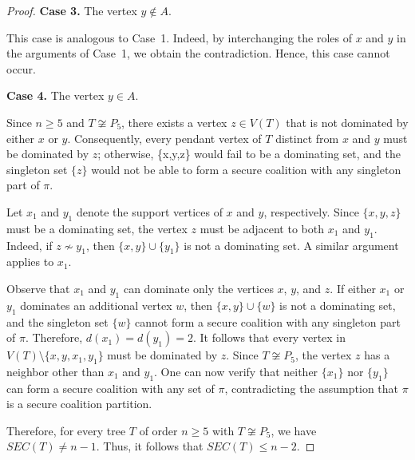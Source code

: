 \documentclass[10pt,a4paper]{amsart}
\begin{document}
\begin{proof}
\textbf{Case 3.} The vertex $y\notin A$.

This case is analogous to Case~1. Indeed, by interchanging the roles of $x$ and $y$ in the arguments of Case~1, we obtain the  contradiction. Hence, this case cannot occur.

\textbf{Case 4.} The vertex $y\in A$.

Since $n\ge 5$ and $T\not\cong P_5$, there exists a vertex $z\in V(T)$ that is not dominated by either $x$ or $y$. Consequently, every pendant vertex of $T$ distinct from $x$ and $y$ must be dominated by $z$; otherwise, \{x,y,z\} would fail to be a dominating set, and the singleton set $\{z\}$ would not be able to form a secure coalition with any singleton part of $\pi$.

Let $x_1$ and $y_1$ denote the support vertices of $x$ and $y$, respectively. Since $\{x,y,z\}$ must be a dominating set, the vertex $z$ must be adjacent to both $x_1$ and $y_1$. Indeed, if $z\not\sim y_1$, then $\{x,y\}\cup\{y_1\}$ is not a dominating set. A similar argument applies to $x_1$.

Observe that $x_1$ and $y_1$ can dominate only the vertices $x$, $y$, and $z$. If either $x_1$ or $y_1$ dominates an additional vertex $w$, then $\{x,y\}\cup\{w\}$ is not a dominating set, and the singleton set $\{w\}$ cannot form a secure coalition with any singleton part of $\pi$. Therefore, $d(x_1)=d(y_1)=2$. It follows that every vertex in $V(T)\setminus\{x,y,x_1,y_1\}$
must be dominated by $z$. Since $T\not\cong P_5$, the vertex $z$ has a neighbor other than $x_1$ and $y_1$. One can now verify that neither $\{x_1\}$ nor $\{y_1\}$ can form a secure coalition with any set of $\pi$, contradicting the assumption that $\pi$ is a secure coalition partition.

Therefore, for every tree $T$ of order $n\ge 5$ with $T\not\cong P_5$, we have $SEC(T)\neq n-1$. Thus, it follows that
$SEC(T)\le n-2$.
\end{proof}
\end{document}
